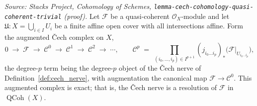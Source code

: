 \begin{lemma}\leanok
  \label{lem:cech_augmented_resolution}
  \textit{Source: Stacks Project, Cohomology of Schemes,
  \texttt{lemma-cech-cohomology-quasi-coherent-trivial} (proof).}
  Let \(\mathcal{F}\) be a quasi-coherent \(\mathcal{O}_X\)-module and let
  \(\mathfrak{U} : X = \bigcup_{i \in I} U_i\) be a finite affine open cover with all
  intersections affine. Form the augmented {\v C}ech complex on \(X\),
  \[
    0 \;\to\; \mathcal{F} \;\to\; \mathcal{C}^0 \;\to\; \mathcal{C}^1 \;\to\;
    \mathcal{C}^2 \;\to\; \cdots,
    \qquad
    \mathcal{C}^p \;=\; \prod_{(i_0, \ldots, i_p) \in I^{p+1}}
      (j_{i_0 \ldots i_p})_*\bigl(\mathcal{F}|_{U_{i_0 \ldots i_p}}\bigr),
  \]
  the degree-\(p\) term being the degree-\(p\) object of the {\v C}ech nerve of
  Definition~\ref{def:cech_nerve}, with augmentation the canonical map
  \(\mathcal{F} \to \mathcal{C}^0\). This augmented complex is exact; that is, the
  {\v C}ech nerve is a resolution of \(\mathcal{F}\) in \(\operatorname{QCoh}(X)\).
\end{lemma}

